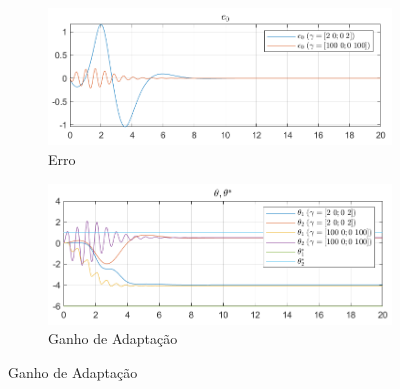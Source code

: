 \documentclass[10pt]{article}
\begin{document}
\begin{figure}[h!]
    \centering
    \begin{subfigure}[b]{0.45\textwidth}
        \centering
        \includegraphics[width=\textwidth]{img/fig05a.png}
        \caption{Erro}
    \end{subfigure}
    \begin{subfigure}[b]{0.45\textwidth}
        \centering
        \includegraphics[width=\textwidth]{img/fig05b.png}
        \caption{Ganho de Adaptação}
    \end{subfigure}

    \vspace{0.5cm}


\end{figure}
\end{document}
